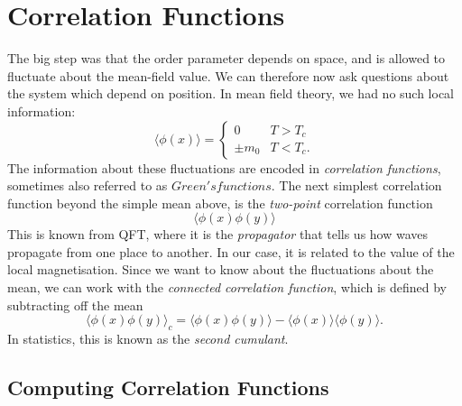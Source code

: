 \section{Correlation Functions}%
\label{sec:correlation_functions}

The big step was that the order parameter depends on space, and is allowed to fluctuate about the mean-field value.
We can therefore now ask questions about the system which depend on position.
In mean field theory, we had no such local information:
\begin{equation}
  \langle \phi(x) \rangle = 
  \begin{cases}
    0 & T > T_c \\
    \pm m_0 & T < T_c.
  \end{cases}
\end{equation}
The information about these fluctuations are encoded in \emph{correlation functions}, sometimes also referred to as $Green's functions$.
The next simplest correlation function beyond the simple mean above, is the \emph{two-point} correlation function
\begin{equation}
  \langle \phi(x) \phi(y) \rangle
\end{equation}
This is known from QFT, where it is the \emph{propagator} that tells us how waves propagate from one place to another.
In our case, it is related to the value of the local magnetisation.
Since we want to know about the fluctuations about the mean, we can work with the \emph{connected correlation function}, which is defined by subtracting off the mean
\begin{equation}
  \langle \phi(x) \phi(y) \rangle_c = \langle \phi(x) \phi(y) \rangle - \langle \phi(x) \rangle \langle \phi(y) \rangle.
\end{equation}
In statistics, this is known as the \emph{second cumulant}.

\subsection{Computing Correlation Functions}%
\label{sub:computing_correlation_functions}

